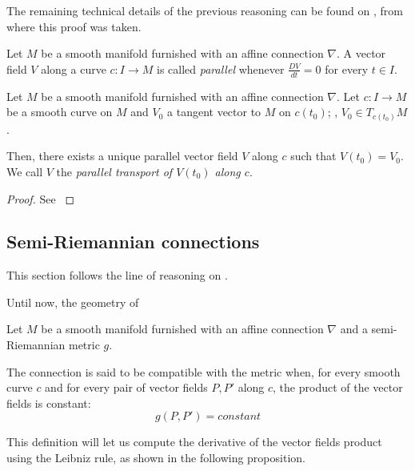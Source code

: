 The remaining technical details of the previous reasoning can be found on \cite[p. 43]{docarmo79}, from where this proof was taken.

\begin{definition}
	Let $M$ be a smooth manifold furnished with an affine connection $\nabla$. A vector field $V$ along a curve $c \colon I \to M$ is called \emph{parallel} whenever $\frac{DV}{dt} = 0$ for every $t \in I$.
\end{definition}

\begin{proposition}[Parallel transport]
	Let $M$ be a smooth manifold furnished with an affine connection $\nabla$. Let $c \colon I \to M$ be a smooth curve on $M$ and $V_0$ a tangent vector to $M$ on $c(t_0)$; \ie, $V_0 \in T_{c(t_0)} M$.
	
	Then, there exists a unique parallel vector field $V$ along $c$ such that $V(t_0) = V_0$. We call $V$ the \emph{parallel transport of $V(t_0)$ along $c$}.
\end{proposition}

\begin{proof}
	See \cite[Proposition 2.6 on section 2.2]{docarmo79}
\end{proof}

\subsection{Semi-Riemannian connections}

This section follows the line of reasoning on \cite[Ch. 2, Section 3]{docarmo79}.

Until now, the geometry of 

\begin{definition}
	Let $M$ be a smooth manifold furnished with an affine connection $\nabla$ and a semi-Riemannian metric $g$.
	
	The connection is said to be compatible with the metric when, for every smooth curve $c$ and for every pair of vector fields $P, P'$ along $c$, the product of the vector fields is constant:
	\[
		g(P, P') = constant
	\]
\end{definition}

This definition will let us compute the derivative of the vector fields product using the Leibniz rule, as shown in the following proposition.

